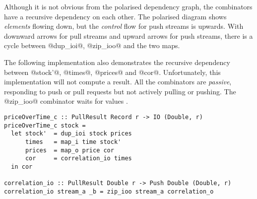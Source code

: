 Although it is not obvious from the polarised dependency graph, the combinators have a recursive dependency on each other.
The polarised diagram shows \emph{elements} flowing down, but the \emph{control} flow for push streams is upwards.
With downward arrows for pull streams and upward arrows for push streams, there is a cycle between @dup_ioi@, @zip_ioo@ and the two maps.

The following implementation also demonstrates the recursive dependency between @stock'@, @times@, @prices@ and @cor@.
Unfortunately, this implementation will not compute a result.
All the combinators are \emph{passive}, responding to push or pull requests but not actively pulling or pushing.
The @zip_ioo@ combinator waits for values \TODO{}.



\begin{lstlisting}
priceOverTime_c :: PullResult Record r -> IO (Double, r)
priceOverTime_c stock =
  let stock'  = dup_ioi stock prices
      times   = map_i time stock'
      prices  = map_o price cor
      cor     = correlation_io times
  in cor

correlation_io :: PullResult Double r -> Push Double (Double, r)
correlation_io stream_a _b = zip_ioo stream_a correlation_o
\end{lstlisting}

% 
% 
% 
% 
% 
% 

